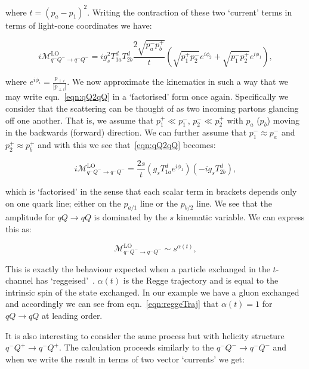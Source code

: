 	where $t = (p_a - p_1)^2$.  Writing the contraction of these two `current'
	terms in terms of light-cone coordinates we have:

	\begin{equation}
		i\mathcal{M}_{q^-Q^-\rightarrow q^-Q^-}^{\text{LO}} = ig_s^2T^d_{1a}T^d_{2b}
		\frac{2\sqrt{p_a^-p_b^+}}{t}
		\left(\sqrt{p_1^+p_2^-}e^{i\phi_2} + \sqrt{p_1^-p_2^+}e^{i\phi_1}\right),
		\label{eqn:qQ2qQ}
	\end{equation}

	where $e^{i\phi_i} = \frac{p_{\perp i}}{|p_{\perp i}|}$.  We now approximate the kinematics
	in such a way that we may write eqn.~\eqref{eqn:qQ2qQ} in a `factorised' form once again.
	Specifically we consider that the scattering can be thought of as two incoming partons glancing off
	one another.  That is, we assume that $p_1^+\ll p_1^-$, $p_2^-\ll p_2^+$ with $p_a$ ($p_b$)
	moving in the backwards (forward) direction.  We can further assume that $p_1^-\approx p_a^-$
	and $p_2^+\approx p_b^+$ and with this we see that~\eqref{eqn:qQ2qQ} becomes:

	\begin{equation}
		i\mathcal{M}_{q^-Q^-\rightarrow q^-Q^-}^{\text{LO}} =
		\frac{2s}{t}\left(g_sT^d_{1a}e^{i\phi_1}\right)\left(-ig_sT^d_{2b}\right),
		\label{eqn:reggeTraj}
	\end{equation}

	which is `factorised' in the sense that each scalar term in brackets depends only on one
	quark line; either on the $p_{a/1}$ line or the $p_{b/2}$ line.  We see that the amplitude
	for $qQ\rightarrow qQ$ is dominated by the $s$ kinematic variable.  We can express this as:

	\begin{equation}
		\mathcal{M}_{q^-Q^-\rightarrow q^-Q^-}^{\text{LO}} \sim s^{\alpha(t)},
	\end{equation}

	This is exactly the behaviour expected when a particle exchanged in the $t$-channel has
	`reggeised'~\cite{sabioThesis,DelDuca:1995hf,lipatovBook}.  $\alpha(t)$ is the Regge trajectory and is equal to
	the intrinsic spin of the state exchanged.  In our example we have a gluon exchanged
	and accordingly we can see from eqn.~\eqref{eqn:reggeTraj} that $\alpha(t)=1$ for $qQ\rightarrow qQ$ at leading order.

	It is also interesting to consider the same process but with helicity structure $q^-Q^+\to q^-Q^+$.
	The calculation proceeds similarly to the $q^-Q^-\to q^-Q^-$ and when we write the result in
	terms of two vector `currents' we get:

